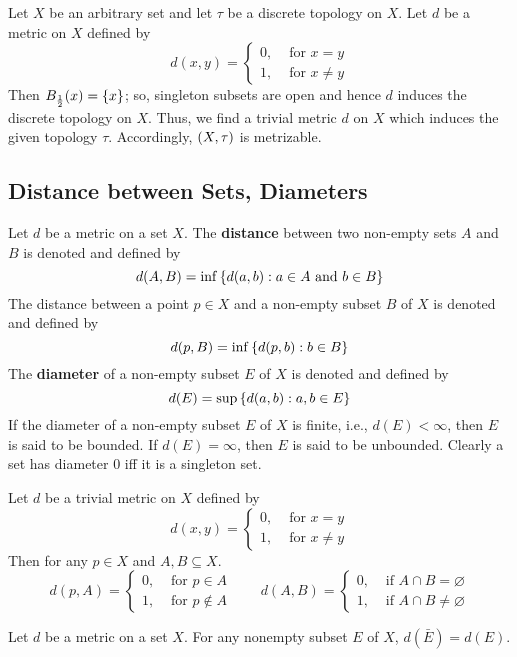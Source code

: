 \documentclass[../main-sheet.tex]{subfiles}
\begin{document}
\begin{ex}
    Let \(X\) be an arbitrary set and let \(\tau\) be a discrete topology on \(X\). Let \(d\) be a metric on \(X\) defined by 
\[d(x,y)=\begin{cases}
    0,&\text{ for }x=y\\
    1,&\text{ for }x\neq y
\end{cases}\]
Then \(B_{\frac{1}{2}}(x)=\left\{x\right\}   \); so, singleton subsets are open and hence \(d\) induces the discrete topology on     \(X\). Thus, we find a trivial metric \(d\) on \(X\) which induces the given topology \(\tau\). Accordingly, \((X, \tau)\) is metrizable.
\end{ex}
\subsection{Distance between Sets, Diameters}
Let \(d\) be a metric on a set \(X\). The \textbf{distance} between two non-empty sets \(A\) and \(B\) is denoted and defined by
\[d(A,B)=\inf\left\{d(a,b):a\in A\text{ and }b\in B\right\}\]
The distance between a point \(p\in X\) and a non-empty subset \(B\) of \(X\) is denoted and defined by
\[d(p,B)=\inf\left\{d(p,b):b\in B\right\}\]
The \textbf{diameter} of a non-empty subset \(E\) of \(X\) is denoted and defined by 
\[d(E)=\sup\left\{d(a,b):a,b\in E\right\}\]
If the diameter of a non-empty subset \(E\) of \(X\) is finite, i.e., \(d(E)<\infty\), then \(E\) is said to be bounded. If \(d(E)=\infty\), then \(E\) is said to be unbounded. Clearly a set has diameter 0 iff it is a singleton set.
\begin{ex}
    Let \(d\) be a trivial metric on \(X\) defined by 
    \[d(x,y)=\begin{cases}
        0,&\text{ for }x=y\\
        1,&\text{ for }x\neq y
    \end{cases}\]
    Then for any \(p\in X\) and \(A,B\subseteq X\).
    \[d(p,A)=\begin{cases}
        0,&\text{ for }p \in A\\
        1,&\text{ for }p\notin A
    \end{cases}\qquad d(A,B)=\begin{cases}
        0,&\text{ if }A\cap B=\varnothing\\
        1,&\text{ if }A\cap B \neq \varnothing
    \end{cases}\]
\end{ex}
\begin{thm}
    Let \(d\) be a metric on a set \(X\). For any nonempty subset \(E\) of \(X\), \(d(\bar{E})=d(E)\).
\end{thm}
\end{document}
